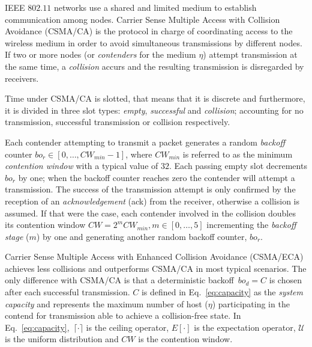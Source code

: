 IEEE $802.11$ networks use a shared and limited medium to establish communication among nodes. Carrier Sense Multiple Access with Collision Avoidance (CSMA/CA) is the protocol in charge of coordinating access to the wireless medium in order to avoid simultaneous transmissions by different nodes. If two or more nodes (or \emph{contenders} for the medium $\eta$) attempt transmission at the same time, a \emph{collision} accurs and the resulting transmission is disregarded by receivers.

Time under CSMA/CA is slotted, that means that it is discrete and furthermore, it is divided in three slot types: \emph{empty}, \emph{successful} and \emph{collision}; accounting for no transmission, successful transmission or collision respectively. 

Each contender attempting to transmit a packet generates a random \emph{backoff} counter $bo_{r} \in [0,\ldots,CW_{min}-1]$, where $CW_{min}$ is referred to as the minimum \emph{contention window} with a typical value of $32$. Each passing empty slot decrements $bo_{r}$ by one; when the backoff counter reaches zero the contender will attempt a transmission. The success of the transmission attempt is only confirmed by the reception of an \emph{acknowledgement} (ack) from the receiver, otherwise a collision is assumed. If that were the case, each contender involved in the collision doubles its contention window $CW = 2^{m}CW_{min}, m\in[0,\ldots,5]$ incrementing the \emph{backoff stage} ($m$) by one and generating another random backoff counter, $bo_{r}$.

Carrier Sense Multiple Access with Enhanced Collision Avoidance (CSMA/ECA) achieves less collisions and outperforms CSMA/CA in most typical scenarios. The only difference with CSMA/CA is that a deterministic backoff~$bo_{d} = C$ is chosen after each successful transmission. $C$ is defined in Eq.~\ref{eq:capacity} as the \emph{system capacity} and represents the maximum number of host ($\eta$) participating in the contend for transmission able to achieve a collision-free state. In Eq.~\ref{eq:capacity},~$\lceil{\cdotp}\rceil$ is the ceiling operator, $E[\cdotp]$ is the expectation operator, $\mathcal{U}$ is the uniform distribution and $CW$ is the contention window.



